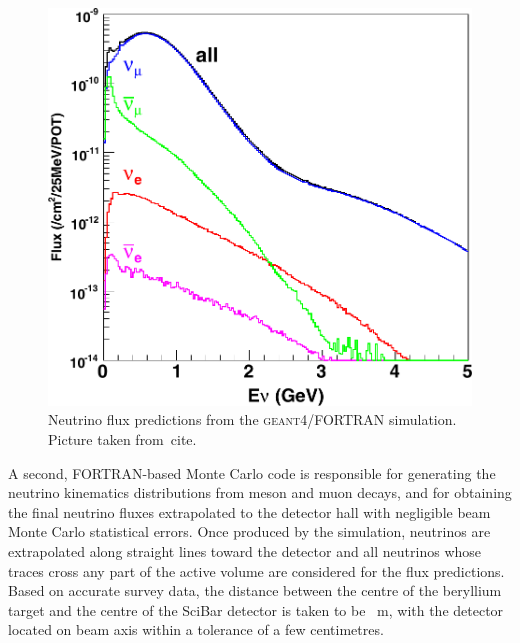  \begin{figure}
   \centering
   \includegraphics[scale=0.25]{pics/fluxprediction}
   \caption{Neutrino flux predictions from the \textsc{geant4}/FORTRAN simulation.
    Picture taken from~cite.}
   \label{fig:fluxp}
 \end{figure}
 
 A second, FORTRAN-based Monte Carlo code is responsible for generating the neutrino %
 kinematics distributions from meson and muon decays, and for obtaining the final neutrino %
 fluxes extrapolated to the detector hall with negligible beam Monte Carlo statistical errors. 
 Once produced by the simulation, neutrinos are extrapolated along straight lines %
 toward the detector and all neutrinos whose traces cross any part of the active volume are %
 considered for the flux predictions.
 Based on accurate survey data, the distance between the centre of the beryllium %
 target and the centre of the SciBar detector is taken to be ~m, %
 with the detector located on beam axis within a tolerance of a few centimetres. 
 
